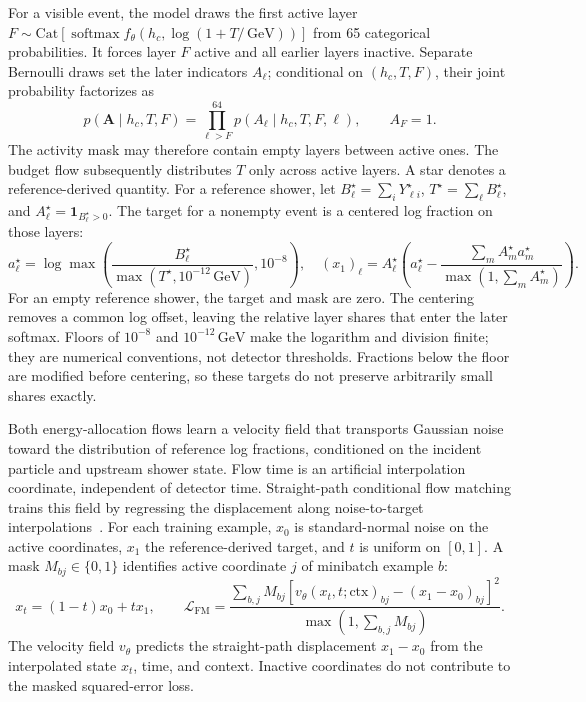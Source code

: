 \documentclass[11pt]{article}
\newcommand{\GeV}{\,\mathrm{GeV}}
\begin{document}
For a visible event, the model draws the first active layer $F\sim\mathrm{Cat}[\operatorname{softmax}f_\theta(h_c,\log(1+T/\GeV))]$ from 65 categorical probabilities. It forces layer $F$ active and all earlier layers inactive. Separate Bernoulli draws set the later indicators $A_\ell$; conditional on $(h_c,T,F)$, their joint probability factorizes as
\begin{equation}
 p(\mathbf A\mid h_c,T,F)=\prod_{\ell>F}^{64}p(A_\ell\mid h_c,T,F,\ell),
 \qquad A_F=1.
 \label{eq:activity}
\end{equation}
The activity mask may therefore contain empty layers between active ones. The budget flow subsequently distributes $T$ only across active layers. A star denotes a reference-derived quantity. For a reference shower, let $B_\ell^\star=\sum_iY_{\ell i}^\star$, $T^\star=\sum_\ell B_\ell^\star$, and $A_\ell^\star=\mathbf 1_{B_\ell^\star>0}$. The target for a nonempty event is a centered log fraction on those layers:
\begin{equation}
 a_\ell^\star=\log\max\!\left(
 \frac{B_\ell^\star}{\max(T^\star,10^{-12}\GeV)},10^{-8}\right),
 \quad (x_1)_\ell=A_\ell^\star\left(
 a_\ell^\star-\frac{\sum_m A_m^\star a_m^\star}
 {\max(1,\sum_m A_m^\star)}\right).
 \label{eq:profile_target}
\end{equation}
For an empty reference shower, the target and mask are zero. The centering removes a common log offset, leaving the relative layer shares that enter the later softmax. Floors of $10^{-8}$ and $10^{-12}\GeV$ make the logarithm and division finite; they are numerical conventions, not detector thresholds. Fractions below the floor are modified before centering, so these targets do not preserve arbitrarily small shares exactly.

Both energy-allocation flows learn a velocity field that transports Gaussian noise toward the distribution of reference log fractions, conditioned on the incident particle and upstream shower state. Flow time is an artificial interpolation coordinate, independent of detector time. Straight-path conditional flow matching trains this field by regressing the displacement along noise-to-target interpolations~\cite{flowmatching}. For each training example, $x_0$ is standard-normal noise on the active coordinates, $x_1$ the reference-derived target, and $t$ is uniform on $[0,1]$. A mask $M_{bj}\in\{0,1\}$ identifies active coordinate $j$ of minibatch example $b$:
\begin{equation}
 x_t=(1-t)x_0+t x_1,\qquad
 \mathcal L_{\mathrm{FM}}=
 \frac{\sum_{b,j}M_{bj}
 [v_\theta(x_t,t;\mathrm{ctx})_{bj}-(x_1-x_0)_{bj}]^2}
 {\max(1,\sum_{b,j}M_{bj})}.
 \label{eq:cfm}
\end{equation}
The velocity field $v_\theta$ predicts the straight-path displacement $x_1-x_0$ from the interpolated state $x_t$, time, and context. Inactive coordinates do not contribute to the masked squared-error loss.
\end{document}
